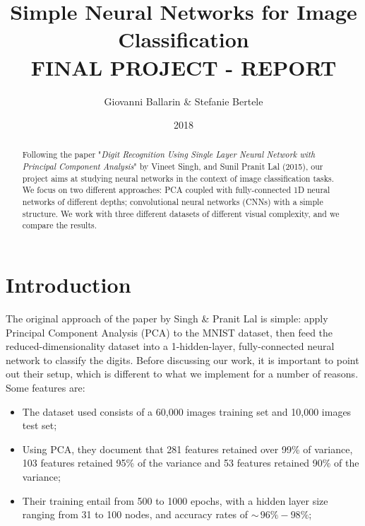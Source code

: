 \documentclass[letterpaper,12pt]{article}
\begin{document}
\lstset{language=Matlab}

\title{Simple Neural Networks for Image Classification\\ \vspace{0.5em} \small{FINAL PROJECT - REPORT}}
\author{Giovanni Ballarin \& Stefanie Bertele}
\date{2018}
\maketitle

\begin{abstract}
Following the paper "\textit{Digit Recognition Using Single Layer Neural Network with Principal Component Analysis}" by Vineet Singh, and Sunil Pranit Lal (2015), our project aims at studying neural networks in the context of image classification tasks. We focus on two different approaches: PCA coupled with fully-connected 1D neural networks of different depths; convolutional neural networks (CNNs) with a simple structure. We work with three different datasets of different visual complexity, and we compare the results.
\end{abstract}


\section{Introduction}

The original approach of the paper by Singh \& Pranit Lal is simple: apply Principal Component Analysis (PCA) to the MNIST dataset, then feed the reduced-dimensionality dataset into a 1-hidden-layer, fully-connected neural network to classify the digits. Before discussing our work, it is important to point out their setup, which is different to what we implement for a number of reasons. \\
Some features are:
\begin{itemize}
\item The dataset used consists of a 60,000 images training set and 10,000 images test set;
\item Using PCA, they document that 281 features retained over 99\% of variance, 103 features retained 95\% of the variance and 53 features retained 90\% of the variance;
\item Their training entail from 500 to 1000 epochs, with a hidden layer size ranging from 31 to 100 nodes, and accuracy rates of $\sim\,96\%-98\%$;
\end{itemize}
\end{document}

